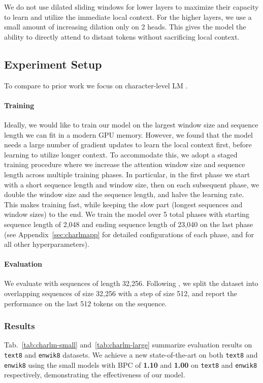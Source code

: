 \documentclass[11pt,a4paper]{article}
\begin{document}
We do not use dilated sliding windows for lower layers to maximize their capacity to learn and utilize the immediate local context.
For the higher layers, we use a small amount of increasing dilation only on 2 heads.
This gives the model the ability to directly attend to distant tokens without sacrificing local context.

\subsection{Experiment Setup}

To compare to prior work we focus on character-level LM \cite[\texttt{text8} and \texttt{enwik8};][]{text8}.

\paragraph{Training}
Ideally, we would like to train our model on the largest window size and sequence length we can fit in a modern GPU memory. However, we found that 
the model needs a large number of gradient updates to learn the local context
first, before learning to utilize longer context. 
To accommodate this, we adopt a staged training procedure where we increase the attention window size and sequence length across multiple training phases. In particular, in the first phase we start with a short sequence length and window size, then on each subsequent phase, we double the window size and the sequence length, and halve the learning rate. 
This makes training fast, while keeping the slow part 
(longest sequences and window sizes) to the end. 
We train the model over 5 total phases with starting sequence length of 2,048 and ending sequence length of 23,040 
on the last phase (see Appendix~\ref{sec:charlmapp} for detailed configurations of each phase, and for all other hyperparameters).

\paragraph{Evaluation}
We evaluate with sequences of length 32,256.  Following \citet{transformerxl}, we split the dataset into overlapping sequences 
of size 32,256 with a step of size 512, and report the performance on the last 512 tokens on the sequence. 

\subsubsection{Results}
Tab.~\ref{tab:charlm-small} and~\ref{tab:charlm-large} summarize evaluation results on \texttt{text8} and \texttt{enwik8} datasets. 
We achieve a new state-of-the-art on both \texttt{text8} and \texttt{enwik8} using the small models with BPC of \textbf{1.10} and \textbf{1.00} on \texttt{text8} and \texttt{enwik8} respectively, demonstrating the effectiveness of our model.
\end{document}
